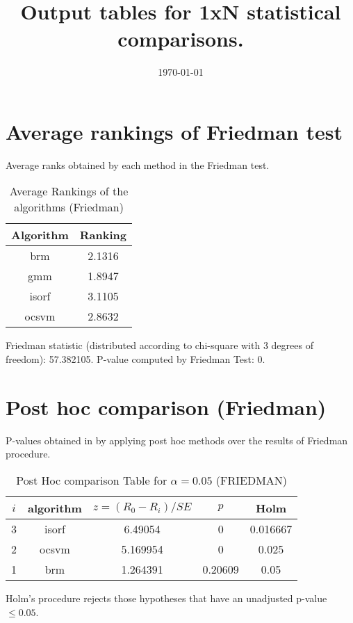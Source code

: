 \documentclass[a4paper,10pt]{article}
\title{Output tables for 1xN statistical comparisons.}
\author{}
\date{\today}
\begin{document}
\begin{landscape}
\pagestyle{empty}
\maketitle
\thispagestyle{empty}

\section{Average rankings of Friedman test}


Average ranks obtained by each method in the Friedman test.

\begin{table}[!htp]
\centering
\begin{tabular}{|c|c|}\hline
Algorithm&Ranking\\\hline
brm&2.1316\\gmm&1.8947\\isorf&3.1105\\ocsvm&2.8632\\\hline\end{tabular}
\caption{Average Rankings of the algorithms (Friedman)}
\end{table}

Friedman statistic (distributed according to chi-square with 3 degrees of freedom): 57.382105. \newline P-value computed by Friedman Test: 0.\newline


\newpage

\section{Post hoc comparison (Friedman)}


P-values obtained in by applying post hoc methods over the results of Friedman procedure.

\begin{table}[!htp]
\centering\footnotesize
\begin{tabular}{ccccc}
$i$&algorithm&$z=(R_0 - R_i)/SE$&$p$&Holm \\
\hline3&isorf&6.49054&0&0.016667\\2&ocsvm&5.169954&0&0.025\\1&brm&1.264391&0.20609&0.05\\\hline
\end{tabular}
\caption{Post Hoc comparison Table for $\alpha=0.05$ (FRIEDMAN)}
\end{table}Holm's procedure rejects those hypotheses that have an unadjusted p-value $\le0.05$.



\end{landscape}
\end{document}
